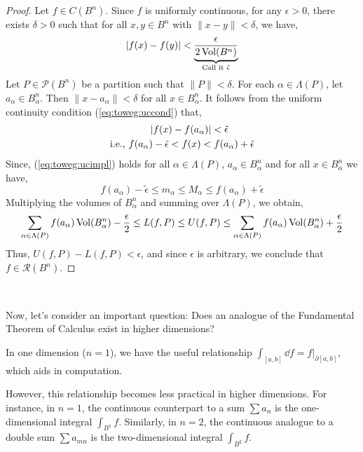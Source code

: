 \documentclass[../Analysis-3.tex]{subfiles}
\begin{document}
\begin{proof}
  Let $f \in C(B^n)$. Since $f$ is uniformly continuous, for any $\epsilon > 0$, there exists $\delta > 0$ such that for all $x, y \in B^n$ with $\|x-y\| < \delta$, we have,
  \begin{equation}\label{eq:toweg:uccond}
    \abs{f(x) - f(y)} < \underbrace{\frac{\epsilon}{2\operatorname{Vol}(B^n)}}_{\text{Call it }\tilde{\epsilon}}
  \end{equation}
  Let $P \in \mathcal{P}(B^n)$ be a partition such that $\|P\| < \delta$. For each $\alpha \in \Lambda(P)$, let $a_{\alpha} \in B_{\alpha}^n$. Then $\|x-a_{\alpha}\| < \delta$ for all $x \in B_{\alpha}^n$. It follows from the uniform continuity condition (\ref{eq:toweg:uccond}) that,
  \begin{align}
    \abs{f(x) - f(a_{\alpha})}                              & < \tilde{\epsilon}  \nonumber                               \\
    \text{i.e., } f(a_{\alpha}) - \tilde{\epsilon} < f(x) < & \; f(a_{\alpha}) + \tilde{\epsilon} \label{eq:toweg:ucimpl}
  \end{align}
  Since, (\ref{eq:toweg:ucimpl}) holds for all $ \alpha \in \Lambda(P) $, $ a_{\alpha} \in B_{\alpha}^n $ and for all $ x \in B_{\alpha}^n $ we have,
  \[  f(a_{\alpha}) - \tilde{\epsilon} \leq m_{\alpha} \leq M_{\alpha} \leq f(a_{\alpha}) + \tilde{\epsilon}  \]
  Multiplying the volumes of $B_{\alpha}^n$ and summing over $\Lambda(P)$, we obtain,
  \[
    \sum_{\alpha \in \Lambda(P)} f(a_{\alpha})\operatorname{Vol}(B_{\alpha}^n) - \frac\epsilon2 \leq L(f,P) \leq U(f,P) \leq \sum_{\alpha \in \Lambda(P)} f(a_{\alpha})\operatorname{Vol}(B_{\alpha}^n) + \frac\epsilon2
  \]
  Thus, $U(f,P) - L(f,P) < \epsilon$, and since $\epsilon$ is arbitrary, we conclude that $f \in \mathscr{R}(B^n)$.
\end{proof}

\

Now, let's consider an important question: Does an analogue of the Fundamental Theorem of Calculus exist in higher dimensions?

In one dimension ($n=1$), we have the useful relationship $ \displaystyle\int_{[a,b]} \dd f = f\Big\vert_{\partial[a,b]} $, which aids in computation.

However, this relationship becomes less practical in higher dimensions. For instance, in $n=1$, the continuous counterpart to a sum $ \displaystyle\sum a_n $ is the one-dimensional integral $ \displaystyle\int_{B^1} f $. Similarly, in $n=2$, the continuous analogue to a double sum $ \displaystyle\sum a_{mn} $ is the two-dimensional integral $ \displaystyle\int_{B^2} f $.
\end{document}
